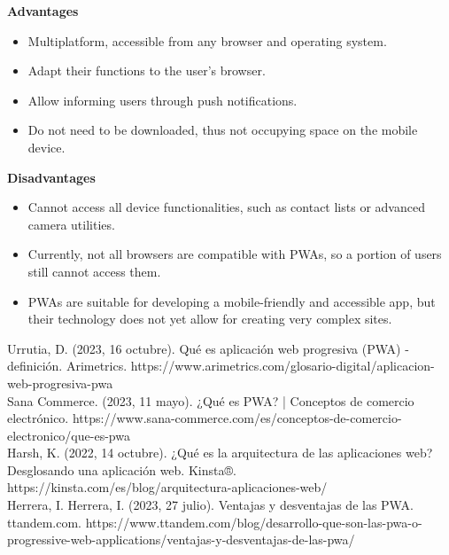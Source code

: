 \documentclass[10pt,a4paper]{article}
\begin{document}
	\textbf{Advantages}
	\begin{itemize}
		\item Multiplatform, accessible from any browser and operating system.
		\item Adapt their functions to the user's browser.
		\item Allow informing users through push notifications.
		\item Do not need to be downloaded, thus not occupying space on the mobile device.
	\end{itemize}
	
	\textbf{Disadvantages}
	\begin{itemize}
		\item Cannot access all device functionalities, such as contact lists or advanced camera utilities.
		\item Currently, not all browsers are compatible with PWAs, so a portion of users still cannot access them.
		\item PWAs are suitable for developing a mobile-friendly and accessible app, but their technology does not yet allow for creating very complex sites.
	\end{itemize}
	Urrutia, D. (2023, 16 octubre). Qué es aplicación web progresiva (PWA) - definición. Arimetrics. https://www.arimetrics.com/glosario-digital/aplicacion-web-progresiva-pwa\\
	
	Sana Commerce. (2023, 11 mayo). ¿Qué es PWA? | Conceptos de comercio electrónico. https://www.sana-commerce.com/es/conceptos-de-comercio-electronico/que-es-pwa\\
	
	Harsh, K. (2022, 14 octubre). ¿Qué es la arquitectura de las aplicaciones web? Desglosando una aplicación web. Kinsta®. https://kinsta.com/es/blog/arquitectura-aplicaciones-web/\\
	
	Herrera, I. Herrera, I. (2023, 27 julio). Ventajas y desventajas de las PWA. ttandem.com. https://www.ttandem.com/blog/desarrollo-que-son-las-pwa-o-progressive-web-applications/ventajas-y-desventajas-de-las-pwa/
\end{document}
